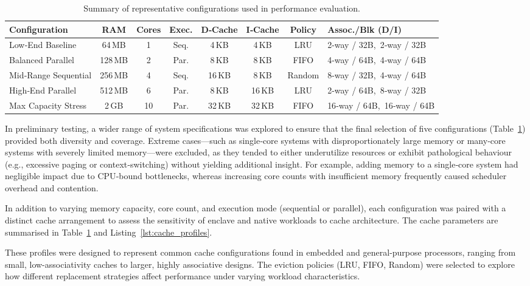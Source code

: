 \begin{table}[h]
\centering
\caption{Summary of representative configurations used in performance evaluation.}
\label{tab:configurations}
\footnotesize
\setlength{\tabcolsep}{5pt}
\renewcommand{\arraystretch}{1.2}
\begin{tabular}{lccccccl}
\toprule
\textbf{Configuration} & \textbf{RAM} & \textbf{Cores} & \textbf{Exec.} &
\textbf{D‑Cache} & \textbf{I‑Cache} & \textbf{Policy} & \textbf{Assoc./Blk (D/I)} \\
\midrule
Low‑End Baseline &
64\,MB & 1 & Seq. &
4\,KB & 4\,KB & LRU & 2‑way / 32B,\ 2‑way / 32B \\
Balanced Parallel &
128\,MB & 2 & Par. &
8\,KB & 8\,KB & FIFO & 4‑way / 64B,\ 4‑way / 64B \\
Mid‑Range Sequential &
256\,MB & 4 & Seq. &
16\,KB & 8\,KB & Random & 8‑way / 32B,\ 4‑way / 64B \\
High‑End Parallel &
512\,MB & 6 & Par. &
8\,KB & 16\,KB & LRU & 2‑way / 64B,\ 8‑way / 32B \\
Max Capacity Stress &
2\,GB & 10 & Par. &
32\,KB & 32\,KB & FIFO & 16‑way / 64B,\ 16‑way / 64B \\
\bottomrule
\end{tabular}
\end{table}

In preliminary testing, a wider range of system specifications was explored to ensure that the final selection of five configurations (Table~\ref{tab:configurations}) provided both diversity and coverage. Extreme cases—such as single‑core systems with disproportionately large memory or many‑core systems with severely limited memory—were excluded, as they tended to either underutilize resources or exhibit pathological behaviour (e.g., excessive paging or context‑switching) without yielding additional insight. For example, adding memory to a single‑core system had negligible impact due to CPU‑bound bottlenecks, whereas increasing core counts with insufficient memory frequently caused scheduler overhead and contention.

In addition to varying memory capacity, core count, and execution mode (sequential or parallel), each configuration was paired with a distinct cache arrangement to assess the sensitivity of enclave and native workloads to cache architecture. The cache parameters are summarised in Table~\ref{tab:configurations} and Listing~\ref{lst:cache_profiles}. 

These profiles were designed to represent common cache configurations found in embedded and general-purpose processors, ranging from small, low-associativity caches to larger, highly associative designs. The eviction policies (LRU, FIFO, Random) were selected to explore how different replacement strategies affect performance under varying workload characteristics.

